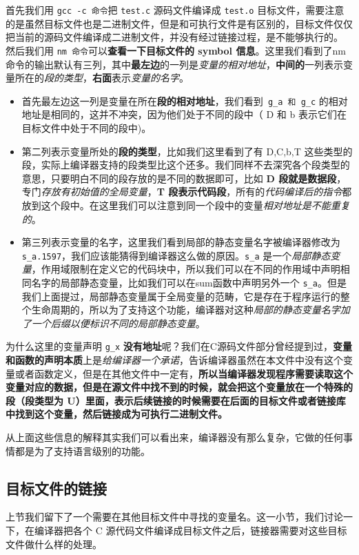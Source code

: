 \documentclass[UTF8,a4paper,12pt]{ctexbook}
\begin{document}
				
				首先我们用 \verb|gcc -c 命令|把 \verb|test.c| 源码文件编译成 \verb|test.o| 目标文件，需要注意的是虽然目标文件也是二进制文件，但是和可执行文件是有区别的，目标文件仅仅把当前的源码文件编译成二进制文件，并没有经过链接过程，是不能够执行的。
				然后我们用 \verb|nm 命令|可以\textbf{查看一下目标文件的 symbol 信息}。这里我们看到了nm命令的输出默认有三列，其中\textbf{最左边}的一列是\textit{变量的相对地址}，\textbf{中间的}一列表示变量所在的\textit{段的类型}，\textbf{右面}表示\textit{变量的名字}。
				
				\begin{itemize}
					\item 首先最左边这一列是变量在所在\textbf{段的相对地址}，我们看到\verb| g_a 和 g_c| 的相对地址是相同的，这并不冲突，因为他们处于不同的段中（ D 和 b 表示它们在目标文件中处于不同的段中)。
					\item 第二列表示变量所处的\textbf{段的类型}，比如我们这里看到了有 D,C,b,T 这些类型的段，实际上编译器支持的段类型比这个还多。我们同样不去深究各个段类型的意思，只要明白不同的段存放的是不同的数据即可，比如 \textbf{D 段就是数据段}，专门\textit{存放有初始值的全局变量}，\textbf{T 段表示代码段}，所有的\textit{代码编译后的指令}都放到这个段中。在这里我们可以注意到同一个段中的变量\textit{相对地址是不能重复的}。
					\item 第三列表示变量的名字，这里我们看到局部的静态变量名字被编译器修改为 \verb|s_a.1597|，我们应该能猜得到编译器这么做的原因。\verb|s_a| 是一个\textit{局部静态变量}，作用域限制在定义它的代码块中，所以我们可以在不同的作用域中声明相同名字的局部静态变量，比如我们可以在sum函数中声明另外一个 \verb|s_a|。但是我们上面提过，局部静态变量属于全局变量的范畴，它是存在于程序运行的整个生命周期的，所以为了支持这个功能，编译器对这种\textit{局部的静态变量名字加了一个后缀以便标识不同的局部静态变量}。
				\end{itemize}
				
				为什么这里的变量声明 \verb|g_x| \textbf{没有地址}呢？我们在C源码文件部分曾经提到过，\textbf{变量和函数的声明本质}上是\textit{给编译器一个承诺}，告诉编译器虽然在本文件中没有这个变量或者函数定义，但是在其他文件中一定有，\textbf{所以当编译器发现程序需要读取这个变量对应的数据，但是在源文件中找不到的时候，就会把这个变量放在一个特殊的段（段类型为 U）里面，表示后续链接的时候需要在后面的目标文件或者链接库中找到这个变量，然后链接成为可执行二进制文件。}
				
				从上面这些信息的解释其实我们可以看出来，编译器没有那么复杂，它做的任何事情都是为了支持语言级别的功能。
				
			\subsection{目标文件的链接}
				上节我们留下了一个需要在其他目标文件中寻找的变量名。这一小节，我们讨论一下，在编译器把各个 C 源代码文件编译成目标文件之后，链接器需要对这些目标文件做什么样的处理。
				
\end{document}
